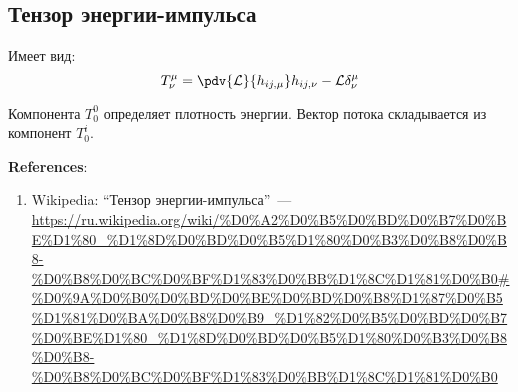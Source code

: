 \documentclass[\docroot/reports/draft/report.tex]{subfiles}
\begin{document}
\onlyinsubfile{\tableofcontents}

\subsection{Тензор энергии-импульса}

    Имеет вид:
    \begin{equation}
        T^\mu_\nu = \pdv{\mathcal{L}}{h_{ij,\mu}} h_{ij,\nu} - \mathcal{L} \delta^\mu_\nu
    \end{equation}

    Компонента $T^0_0$ определяет плотность энергии. Вектор потока складывается из компонент $T^i_0$.

    \vspace{1cm}

    \textbf{\Large{References}}:
    \begin{enumerate}
        \item Wikipedia: \enquote{Тензор энергии-импульса}~--- \url{https://ru.wikipedia.org/wiki/%D0%A2%D0%B5%D0%BD%D0%B7%D0%BE%D1%80_%D1%8D%D0%BD%D0%B5%D1%80%D0%B3%D0%B8%D0%B8-%D0%B8%D0%BC%D0%BF%D1%83%D0%BB%D1%8C%D1%81%D0%B0#%D0%9A%D0%B0%D0%BD%D0%BE%D0%BD%D0%B8%D1%87%D0%B5%D1%81%D0%BA%D0%B8%D0%B9_%D1%82%D0%B5%D0%BD%D0%B7%D0%BE%D1%80_%D1%8D%D0%BD%D0%B5%D1%80%D0%B3%D0%B8%D0%B8-%D0%B8%D0%BC%D0%BF%D1%83%D0%BB%D1%8C%D1%81%D0%B0}
    \end{enumerate}

\end{document}
